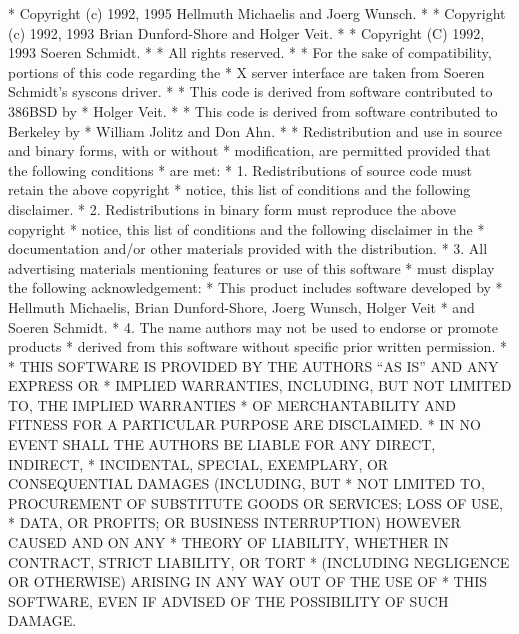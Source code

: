 \begin{copyrightEnv}
 * Copyright (c) 1992, 1995 Hellmuth Michaelis and Joerg Wunsch.
 *
 * Copyright (c) 1992, 1993 Brian Dunford-Shore and Holger Veit.
 *
 * Copyright (C) 1992, 1993 Soeren Schmidt.
 *
 * All rights reserved.
 *
 * For the sake of compatibility, portions of this code regarding the
 * X server interface are taken from Soeren Schmidt's syscons driver.
 *
 * This code is derived from software contributed to 386BSD by
 * Holger Veit.
 *
 * This code is derived from software contributed to Berkeley by
 * William Jolitz and Don Ahn.
 *
 * Redistribution and use in source and binary forms, with or without
 * modification, are permitted provided that the following conditions
 * are met:
 * 1. Redistributions of source code must retain the above copyright
 *    notice, this list of conditions and the following disclaimer.
 * 2. Redistributions in binary form must reproduce the above copyright
 *    notice, this list of conditions and the following disclaimer in the
 *    documentation and/or other materials provided with the distribution.
 * 3. All advertising materials mentioning features or use of this software
 *    must display the following acknowledgement:
 *      This product includes software developed by
 *      Hellmuth Michaelis, Brian Dunford-Shore, Joerg Wunsch, Holger Veit
 *      and Soeren Schmidt.
 * 4. The name authors may not be used to endorse or promote products
 *    derived from this software without specific prior written permission.
 *
 * THIS SOFTWARE IS PROVIDED BY THE AUTHORS ``AS IS'' AND ANY EXPRESS OR
 * IMPLIED WARRANTIES, INCLUDING, BUT NOT LIMITED TO, THE IMPLIED WARRANTIES
 * OF MERCHANTABILITY AND FITNESS FOR A PARTICULAR PURPOSE ARE DISCLAIMED.
 * IN NO EVENT SHALL THE AUTHORS BE LIABLE FOR ANY DIRECT, INDIRECT,
 * INCIDENTAL, SPECIAL, EXEMPLARY, OR CONSEQUENTIAL DAMAGES (INCLUDING, BUT
 * NOT LIMITED TO, PROCUREMENT OF SUBSTITUTE GOODS OR SERVICES; LOSS OF USE,
 * DATA, OR PROFITS; OR BUSINESS INTERRUPTION) HOWEVER CAUSED AND ON ANY
 * THEORY OF LIABILITY, WHETHER IN CONTRACT, STRICT LIABILITY, OR TORT
 * (INCLUDING NEGLIGENCE OR OTHERWISE) ARISING IN ANY WAY OUT OF THE USE OF
 * THIS SOFTWARE, EVEN IF ADVISED OF THE POSSIBILITY OF SUCH DAMAGE.
\end{copyrightEnv}


